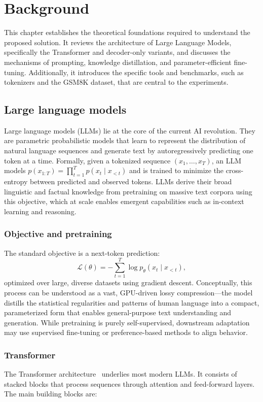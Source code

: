 \chapter{Background}

This chapter establishes the theoretical foundations required to understand the proposed solution. It reviews the architecture of Large Language Models, specifically the Transformer and decoder-only variants, and discusses the mechanisms of prompting, knowledge distillation, and parameter-efficient fine-tuning. Additionally, it introduces the specific tools and benchmarks, such as tokenizers and the GSM8K dataset, that are central to the experiments.

\section{Large language models}
Large language models (LLMs) lie at the core of the current AI revolution. They are parametric probabilistic models that learn to represent the distribution of natural language sequences and generate text by autoregressively predicting one token at a time. Formally, given a tokenized sequence $(x_1, \dots, x_T)$, an LLM models $p(x_{1:T})=\prod_{t=1}^T p(x_t \mid x_{<t})$ and is trained to minimize the cross-entropy between predicted and observed tokens. LLMs derive their broad linguistic and factual knowledge from pretraining on massive text corpora using this objective, which at scale enables emergent capabilities such as in-context learning and reasoning.

\subsection{Objective and pretraining}
The standard objective is a next-token prediction:
\begin{equation*}
\mathcal{L}(\theta) = - \sum_{t=1}^{T} \log p_\theta(x_t \mid x_{<t}),
\end{equation*}
optimized over large, diverse datasets using gradient descent. Conceptually, this process can be understood as a vast, GPU-driven lossy compression---the model distills the statistical regularities and patterns of human language into a compact, parameterized form that enables general-purpose text understanding and generation. While pretraining is purely self-supervised, downstream adaptation may use supervised fine-tuning or preference-based methods to align behavior.

\subsection{Transformer}
The Transformer architecture~\cite{vaswani2023attentionneed} underlies most modern LLMs. It consists of stacked blocks that process sequences through attention and feed-forward layers. The main building blocks are:

